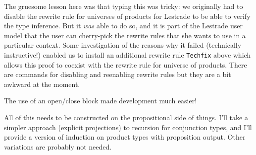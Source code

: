 \documentclass{article}
\begin{document}
The gruesome lesson here was that typing this was tricky:  we originally had to disable the rewrite rule for universes of products for Lestrade to be able to verify the type inference.  But it {\em was\/} able to do so, and it is part of the Lestrade user model that the user can cherry-pick the rewrite rules that she wants to use in a particular context. Some investigation of the reasons why it failed (technically instructive!) enabled us to install an additional rewrite rule {\tt Techfix} above which allows this proof to coexist with the rewrite rule for universe of products. There are commands for disabling and reenabling rewrite rules but they are a bit awkward at the moment.

The use of an open/close block made development much easier!

All of this needs to be constructed on the propositional side of things.  I'll take a simpler approach (explicit projections) to recursion for conjunction types,
and I'll provide a version of induction on product types with proposition output.  Other variations are probably not needed.
\end{document}
